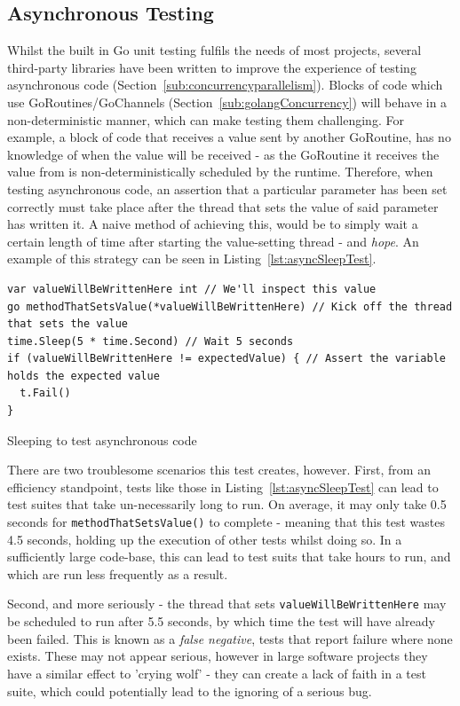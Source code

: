 \subsection{Asynchronous Testing}
\label{sub:asyncTesting}

Whilst the built in Go unit testing fulfils the needs of most projects, several
third-party libraries have been written to improve the experience of testing
asynchronous code (Section~\ref{sub:concurrencyparallelism}). Blocks of code
which use GoRoutines/GoChannels (Section~\ref{sub:golangConcurrency}) will
behave in a non-deterministic manner, which can make testing them challenging.
For example, a block of code that receives a value sent by another GoRoutine,
has no knowledge of when the value will be received - as the GoRoutine it
receives the value from is non-deterministically scheduled by the runtime.
Therefore, when testing asynchronous code, an assertion that a particular
parameter has been set correctly must take place after the thread that sets the
value of said parameter has written it. A naive method of achieving this, would
be to simply wait a certain length of time after starting the value-setting
thread - and \emph{hope}. An example of this strategy can be seen in
Listing~\ref{lst:asyncSleepTest}.

\begin{listing}[H]
  \centering
  \begin{verbatim}
var valueWillBeWrittenHere int // We'll inspect this value
go methodThatSetsValue(*valueWillBeWrittenHere) // Kick off the thread that sets the value
time.Sleep(5 * time.Second) // Wait 5 seconds
if (valueWillBeWrittenHere != expectedValue) { // Assert the variable holds the expected value
  t.Fail()
}
  \end{verbatim}
  \caption{Sleeping to test asynchronous code}
  \label{lst:asyncSleepTest}
\end{listing}

There are two troublesome scenarios this test creates, however. First, from an
efficiency standpoint, tests like those in Listing~\ref{lst:asyncSleepTest} can
lead to test suites that take un-necessarily long to run. On average, it may
only take 0.5 seconds for \texttt{methodThatSetsValue()} to complete -
meaning that this test wastes 4.5 seconds, holding up the execution of other
tests whilst doing so. In a sufficiently large code-base, this can lead to test
suits that take hours to run, and which are run less frequently as a result.

Second, and more seriously - the thread that sets
\texttt{valueWillBeWrittenHere} may be scheduled to run after 5.5
seconds, by which time the test will have already been failed. This is known
as a \emph{\gls{false negative}}, tests that report failure where none exists.
These may not appear serious, however in large software projects they have a
similar effect to 'crying wolf' - they can create a lack of faith in a test
suite, which could potentially lead to the ignoring of a serious bug.

